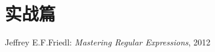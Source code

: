 \documentclass[a4paper]{book}
\begin{document}





\part{实战篇}



\begin{thebibliography}{99}
 Jeffrey E.F.Friedl: {\em Mastering Regular Expressions}, 2012
\end{thebibliography}


\cleardoublepage
{}

\printglossaries

\printindex



\end{document}
